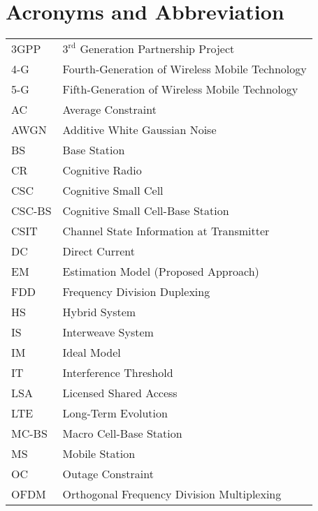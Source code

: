 
\chapter{Acronyms and Abbreviation}
\renewcommand{\arraystretch}{1.0}
\begin{longtable}{p{}p{}}

   	3GPP    &	$3^{\text{rd}}$ Generation Partnership Project \\
   	4-G     &       Fourth-Generation of Wireless Mobile Technology\\	
   	5-G     &       Fifth-Generation of Wireless Mobile Technology\\	
   	AC 	&	Average Constraint\\
   	AWGN	&	Additive White Gaussian Noise \\
	BS	&	Base Station \\
        CR 	&	Cognitive Radio \\
        CSC 	&	Cognitive Small Cell\\
	CSC-BS	&	Cognitive Small Cell-Base Station \\
	CSIT	&	Channel State Information at Transmitter \\
	DC 	&	Direct Current \\
  	EM	&	Estimation Model (Proposed Approach) \\
	FDD	& 	Frequency Division Duplexing \\
	HS	& 	Hybrid System \\
	IS	& 	Interweave System \\
	IM	& 	Ideal Model \\
	IT	& 	Interference Threshold \\
	LSA	& 	Licensed Shared Access \\
	LTE     & 	Long-Term Evolution \\
	MC-BS	&	Macro Cell-Base Station \\
	MS	&	Mobile Station \\
	OC	&	Outage Constraint \\
	OFDM	&	Orthogonal Frequency Division Multiplexing\\

\end{longtable}

